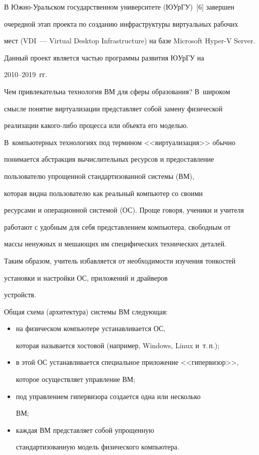 В Южно-Уральском государственном университете (ЮУрГУ)~[6] завершен 


очередной этап проекта по созданию инфраструктуры виртуальных рабочих 


мест (VDI~--- Virtual Desktop Infrastructure) на базе Microsoft Hyper-V Server. 


Данный проект является частью программы развития ЮУрГУ на 


2010--2019~гг.





Чем привлекательна технология ВМ для сферы образования? В~широком 


смысле понятие виртуализации представляет собой замену физической 


реализации ка\-ко\-го-ли\-бо процесса или объекта его моделью. 


В~компьютерных технологиях под термином <<виртуализация>> обычно 


понимается абстракция вычислительных ресурсов и предоставление 


пользователю упрощенной стандартизованной системы (ВМ), 


которая видна пользователю как реальный компьютер со своими 


ресурсами и операционной системой (ОС). Проще говоря, ученики и учителя 


работают с удобным для себя представлением компьютера, свободным от 


массы ненужных и мешающих им специфических технических деталей.





Таким образом, учитель избавляется от необходимости изучения тонкостей 


установки и настройки ОС, приложений и драйверов 


устройств.





Общая схема (архитектура) системы ВМ следующая:


\begin{itemize}


\item  на физическом компьютере устанавливается ОС, 


которая называется хостовой (например, Windows, Linux и~т.\,п.);


\item  в этой ОС устанавливается специальное приложение <<гипервизор>>, 


которое осуществляет управление ВМ;


\item  под управлением гипервизора создается одна или несколько 


ВМ;


\item каждая ВМ представляет собой упрощенную 


стандартизованную модель физического компьютера.


\end{itemize}






